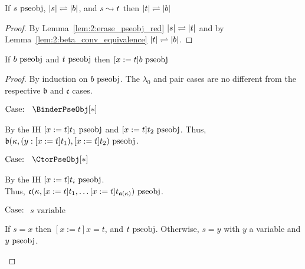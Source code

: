 \begin{lemma}
    If $s~\mbox{\normalfont pseobj}$, $|s| \rightleftharpoons |b|$, and $s \leadsto t$ then $|t| \rightleftharpoons |b|$
    \label{lem:2:pseobj_red_f_step}
\end{lemma}
\begin{proof}
    By Lemma~\ref{lem:2:erase_pseobj_red} $|s| \rightleftharpoons |t|$ and by Lemma~\ref{lem:2:beta_conv_equivalence} $|t| \rightleftharpoons |b|$.
\end{proof}

\begin{lemma}
    If $b~\mbox{\normalfont pseobj}$ and $t~\mbox{\normalfont pseobj}$ then $[x := t]b~\mbox{\normalfont pseobj}$
    \label{lem:2:pseobj_subst}
\end{lemma}
\begin{proof}
    By induction on $b~\mbox{\normalfont pseobj}$. The $\lambda_0$ and pair cases are no different from the respective $\mathfrak{b}$ and $\mathfrak{c}$ cases.

    $\text{Case: }\begin{array}{c} \BinderPseObj[*] \end{array}$
    \begin{proofcase}
        By the IH $[x := t]t_1~\mbox{\normalfont pseobj}$ and $[x := t]t_2~\mbox{\normalfont pseobj}$.
        Thus, $\mathfrak{b}(\kappa, (y : [x := t]t_1), [x := t]t_2)~\mbox{\normalfont pseobj}$.
    \end{proofcase}

    $\text{Case: }\begin{array}{c} \CtorPseObj[*] \end{array}$
    \begin{proofcase}
        By the IH $[x := t]t_i~\mbox{\normalfont pseobj}$. \\
        Thus, $\mathfrak{c}(\kappa, [x := t]t_1, \ldots [x := t]t_{\mathfrak{a}(\kappa)})~\mbox{\normalfont pseobj}$.
    \end{proofcase}

    $\text{Case: }\begin{array}{c} s\text{ variable} \end{array}$
    \begin{proofcase}
        If $s = x$ then $[x := t]x = t$, and $t~\mbox{\normalfont pseobj}$.
        Otherwise, $s = y$ with $y$ a variable and $y~\mbox{\normalfont pseobj}$.
    \end{proofcase}
\end{proof}

